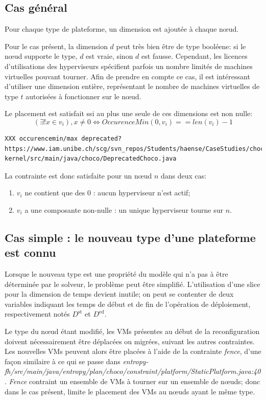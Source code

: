 \documentclass[a4paper]{article}
\begin{document}
\subsection{Cas général}
Pour chaque type de plateforme, un dimension est ajoutée à chaque
nœud.

Pour le cas présent, la dimension $d$ peut très bien être de type booléene:
si le nœud supporte le type, $d$ est vraie, sinon $d$ est fausse.
Cependant, les licences d'utilisations des hyperviseurs spécifient
parfois un nombre limités de machines virtuelles pouvant tourner. Afin
de prendre en compte ce cas, il est intéressant d'utiliser une dimension
entière, représentant le nombre de machines virtuelles de type $t$
autorisées à fonctionner sur le nœud.

Le placement est satisfait ssi au plus une seule de ces dimensions est
non nulle:
\[
	(\exists ! x \in v_i), x \neq 0
	\Leftrightarrow OccurenceMin(0, v_i) == len(v_i)-1
\]

\begin{verbatim}
XXX occurencemin/max deprecated?
https://www.iam.unibe.ch/scg/svn_repos/Students/haense/CaseStudies/choco/choco-kernel/src/main/java/choco/DeprecatedChoco.java
\end{verbatim}

La contrainte est donc satisfaite pour un nœud $n$ dans deux cas:
\begin{enumerate}
	\item $v_i$ ne contient que des $0$ : aucun hyperviseur n'est actif;
	\item $v_i$ a une composante non-nulle : un unique hyperviseur tourne sur $n$.
\end{enumerate}


\subsection{Cas simple : le nouveau type d'une plateforme est connu}
Lorsque le nouveau type est une propriété du modèle qui n'a pas à être
déterminée par le solveur, le problème peut être simplifié. L'utilisation
d'une slice pour la dimension de temps devient inutile; on peut se contenter
de deux variables indiquant les temps de début et de fin de l'opération de
déploiement, respectivement notés $D^\mathrm{st}$ et $D^\mathrm{ed}$.

Le type du nœud étant modifié, les VMs présentes au début de la reconfiguration
doivent nécessairement être déplacées ou migrées, suivant les autres
contraintes. Les nouvelles VMs peuvent alors être placées à l'aide de
la contrainte \textit{fence}, d'une façon similaire à ce qui se passe dans
\textit{entropy-fh/src/main/java/entropy/plan/choco/constraint/platform/StaticPlatform.java:40}. \textit{Fence} contraint un ensemble de VMs à tourner sur un
ensemble de nœuds; donc dans le cas présent, limite le placement des VMs
au nœuds ayant le même type.
\end{document}
